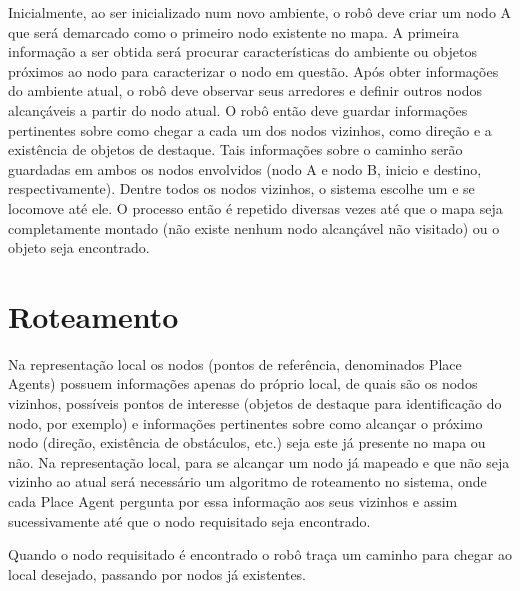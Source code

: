 Inicialmente, ao ser inicializado num novo ambiente, o robô deve criar um nodo A que será demarcado como o primeiro nodo existente no mapa. A primeira informação a ser obtida será procurar características do ambiente ou objetos próximos ao nodo para caracterizar o nodo em questão. Após obter informações do ambiente atual, o robô deve observar seus arredores e definir outros nodos alcançáveis a partir do nodo atual. O robô então deve guardar informações pertinentes sobre como chegar a cada um dos nodos vizinhos, como direção e a existência de objetos de destaque. Tais informações sobre o caminho serão guardadas em ambos os nodos envolvidos (nodo A e nodo B, inicio e destino, respectivamente). Dentre todos os nodos vizinhos, o sistema escolhe um e se locomove até ele. O processo então é repetido diversas vezes até que o mapa seja completamente montado (não existe nenhum nodo alcançável não visitado) ou o objeto seja encontrado.

\section{Roteamento}

Na representação local os nodos (pontos de referência, denominados Place Agents) possuem informações apenas do próprio local, de quais são os nodos vizinhos, possíveis pontos de interesse (objetos de destaque para identificação do nodo, por exemplo) e informações pertinentes sobre como alcançar o próximo nodo (direção, existência de obstáculos, etc.) seja este já presente no mapa ou não. Na representação local, para se alcançar um nodo já mapeado e que não seja vizinho ao atual será necessário um algoritmo de roteamento no sistema, onde cada Place Agent pergunta por essa informação aos seus vizinhos e assim sucessivamente até que o nodo requisitado seja encontrado.

Quando o nodo requisitado é encontrado o robô traça um caminho para chegar ao local desejado, passando por nodos já existentes. 
